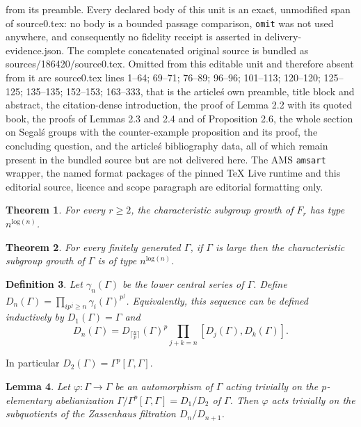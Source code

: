 \documentclass[10pt,a4paper]{amsart}
\newtheorem{theorem}{Theorem}[section]
\newtheorem{definition}[theorem]{Definition}
\newtheorem{lemma}[theorem]{Lemma}
\begin{document}
from its preamble. Every declared body of this unit is an exact, unmodified span of source0.tex: no body is a bounded passage comparison, \texttt{omit} was not used anywhere, and consequently no fidelity receipt is asserted in delivery-evidence.json. The complete concatenated original source is bundled as sources/186420/source0.tex. Omitted from this editable unit and therefore absent from it are source0.tex lines 1--64; 69--71; 76--89; 96--96; 101--113; 120--120; 125--125; 135--135; 152--153; 163--333, that is the article\'s own preamble, title block and abstract, the citation-dense introduction, the proof of Lemma 2.2 with its quoted book, the proofs of Lemmas 2.3 and 2.4 and of Proposition 2.6, the whole section on Segal\'s groups with the counter-example proposition and its proof, the concluding question, and the article\'s bibliography data, all of which remain present in the bundled source but are not delivered here. The AMS \texttt{amsart} wrapper, the named format packages of the pinned TeX Live runtime and this editorial source, licence and scope paragraph are editorial formatting only.\par\smallskip
\setcounter{section}{1}
\setcounter{equation}{0}
\setcounter{theorem}{0}
\begin{theorem}
\label{Characteristic Growth of Free Groups}
For every $r \geq 2$, the characteristic subgroup growth of $F_r$ has type $n^{\mathrm{log}(n)}$.
\end{theorem}

\setcounter{section}{1}
\setcounter{equation}{0}
\setcounter{theorem}{1}
\begin{theorem}
\label{Characteristic Growth of Large Groups}
For every finitely generated $\Gamma$, if $\Gamma$ is large then the characteristic subgroup growth of $\Gamma$ is of type $n^{\mathrm{log}(n)}$.
\end{theorem}

\setcounter{section}{2}
\setcounter{equation}{0}
\setcounter{theorem}{0}
\begin{definition}
Let $\gamma_n(\Gamma)$ be the lower central series of $\Gamma$. Define $D_n(\Gamma) = \prod_{ip^j \geq n} \gamma_i(\Gamma)^{p^j}$.
Equivalently, this sequence can be defined inductively by $D_1(\Gamma) = \Gamma$ and $$D_n(\Gamma) = D_{\lceil\frac{n}{p}\rceil}(\Gamma)^p \prod_{j + k = n}[D_j(\Gamma), D_k(\Gamma)].$$
\end{definition}
In particular $D_2(\Gamma) = \Gamma^p[\Gamma, \Gamma]$.


\setcounter{section}{2}
\setcounter{equation}{0}
\setcounter{theorem}{1}
\begin{lemma}
\label{Automorphism Action}
Let $\varphi:\Gamma \to \Gamma$ be an automorphism of $\Gamma$ acting trivially on the $p$-elementary abelianization $\Gamma/\Gamma^p[\Gamma,\Gamma] = D_1 / D_2$ of $\Gamma$. Then $\varphi$ acts trivially on the subquotients of the Zassenhaus filtration $D_n / D_{n + 1}$.
\end{lemma}
\end{document}
